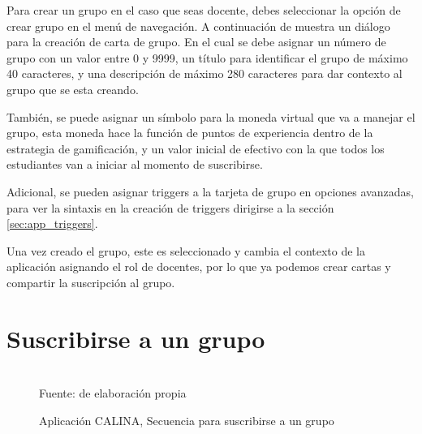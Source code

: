 Para crear un grupo en el caso que seas docente, debes seleccionar la opción de crear grupo en el menú de 
navegación. A continuación de muestra un diálogo para la creación de carta de grupo. En el cual se debe 
asignar un número de grupo con un valor entre 0 y 9999, un título para identificar el grupo de máximo 40
caracteres, y una descripción de máximo 280 caracteres para dar contexto al grupo que se esta creando.

También, se puede asignar un símbolo para la moneda virtual que va a manejar el grupo, esta moneda hace la
función de puntos de experiencia dentro de la estrategia de gamificación, y un valor inicial de efectivo con
la que todos los estudiantes van a iniciar al momento de suscribirse.

Adicional, se pueden asignar triggers a la tarjeta de grupo en opciones avanzadas, para ver la sintaxis en la 
creación de triggers dirigirse a la sección \ref{sec:app_triggers}.

Una vez creado el grupo, este es seleccionado y cambia el contexto de la aplicación asignando el rol de 
docentes, por lo que ya podemos crear cartas y compartir la suscripción al grupo.

\section{Suscribirse a un grupo}

\begin{figure}[!htb]
\caption[]{Aplicación CALINA, Secuencia para suscribirse a un grupo}
\centering
\begin{adjustbox}{width=15cm}
\end{adjustbox}
\\
{\footnotesize Fuente: de elaboración propia}
\end{figure}

